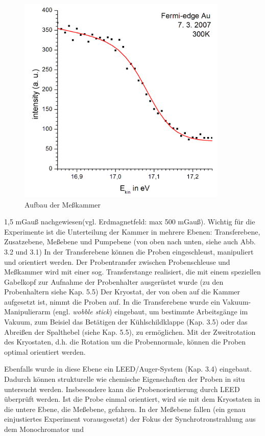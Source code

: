 \documentclass[11pt,twoside,german]{book}
\begin{document}
\begin{figure}
\begin{center}
\includegraphics[width=100mm, keepaspectratio]{pic/fermikante}
\caption{\label{fermikante}Aufbau der Meßkammer}
\end{center}
\end{figure}

1,5 mGauß nachgewiesen(vgl. Erdmagnetfeld: max 500 mGauß). Wichtig für die Experimente ist die Unterteilung der Kammer in mehrere Ebenen: Transferebene, Zusatzebene, Meßebene und Pumpebene (von oben nach unten, siehe auch Abb. 3.2 und 3.1) In der Transferebene können die Proben eingeschleust, manipuliert und orientiert werden. Der Probentransfer zwischen Probenschleuse und Meßkammer wird mit einer sog. Transferstange realisiert, die mit einem speziellen Gabelkopf zur Aufnahme der Probenhalter ausgerüstet wurde (zu den Probenhaltern siehe Kap. 5.5) Der Kryostat, der von oben auf die Kammer aufgesetzt ist, nimmt die Proben auf. In die Transferebene wurde ein Vakuum-Manipulierarm (engl. {\it wobble stick}) eingebaut, um bestimmte Arbeitsgänge im Vakuum, zum Beisiel das Betätigen der Kühlschildklappe (Kap. 3.5) oder das Abreißen der Spalthebel (siehe Kap. 5.5), zu ermöglichen. Mit der Zweitrotation des Kryostaten, d.h. die Rotation um die Probennormale, können die Proben optimal orientiert werden.

Ebenfalls wurde in diese Ebene ein LEED/Auger-System (Kap. 3.4) eingebaut. Dadurch können strukturelle wie chemische Eigenschaften der Proben in situ untersucht werden. Insbesondere kann die Probenorientierung durch LEED überprüft werden. Ist die Probe einmal orientiert, wird sie mit dem Kryostaten in die untere Ebene, die Meßebene, gefahren. In der Meßebene fallen (ein genau einjustiertes Experiment vorausgesetzt) der Fokus der Synchrotronstrahlung aus dem Monochromator und 
\newpage
\end{document}
